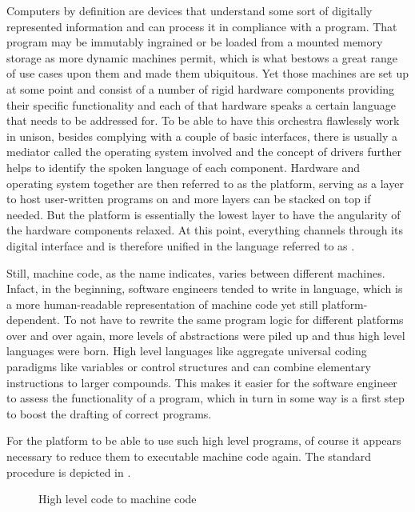 Computers by definition are devices that understand some sort of digitally represented information and can process it in compliance with a program. That program may be immutably ingrained or be loaded from a mounted memory storage as more dynamic machines permit, which is what bestows a great range of use cases upon them and made them ubiquitous. Yet those machines are set up at some point and consist of a number of rigid hardware components providing their specific functionality and each of that hardware speaks a certain language that needs to be addressed for. To be able to have this orchestra flawlessly work in unison, besides complying with a couple of basic interfaces, there is usually a mediator called the operating system involved and the concept of drivers further helps to identify the spoken language of each component. Hardware and operating system together are then referred to as the platform, serving as a layer to host user-written programs on and more layers can be stacked on top if needed. But the platform is essentially the lowest layer to have the angularity of the hardware components relaxed. At this point, everything channels through its digital interface and is therefore unified in the language referred to as .

Still, machine code, as the name indicates, varies between different machines. Infact, in the beginning, software engineers tended to write in  language, which is a more human-readable representation of machine code yet still platform-dependent. To not have to rewrite the same program logic for different platforms over and over again, more levels of abstractions were piled up and thus high level languages were born. High level languages like  aggregate universal coding paradigms like variables or control structures and can combine elementary instructions to larger compounds. This makes it easier for the software engineer to assess the functionality of a program, which in turn in some way is a first step to boost the drafting of correct programs.

For the platform to be able to use such high level programs, of course it appears necessary to reduce them to executable machine code again. The standard procedure is depicted in .

\begin{figure}
	\centering

	

	\caption{High level code to machine code}
	\label{fig:HLLtoMC}
\end{figure}

